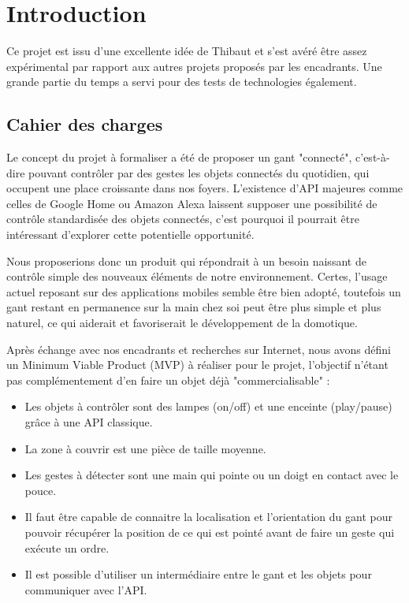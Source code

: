 \documentclass{article}
\begin{document}
    

    
    \tableofcontents

    \section{Introduction}

        Ce projet est issu d'une excellente idée de Thibaut et s'est avéré être assez expérimental par rapport aux autres projets proposés par les encadrants. Une grande partie du temps a servi pour des tests de technologies également.

        \subsection{Cahier des charges}

        Le concept du projet à formaliser a été de proposer un gant "connecté", 
            c'est-à-dire pouvant contrôler par des gestes les objets connectés du quotidien,
            qui occupent une place croissante dans nos foyers. L'existence d'API majeures comme celles
            de Google Home ou Amazon Alexa laissent supposer une possibilité de contrôle standardisée
            des objets connectés, c'est pourquoi il pourrait être intéressant d'explorer cette
            potentielle opportunité.

        Nous proposerions donc un produit qui répondrait à un besoin naissant de contrôle simple des nouveaux
            éléments de notre environnement. Certes, l'usage actuel reposant sur des applications mobiles
            semble être bien adopté, toutefois un gant restant en permanence sur la main chez soi peut être plus
            simple et plus naturel, ce qui aiderait et favoriserait le développement de la domotique.

        Après échange avec nos encadrants et recherches sur Internet, nous avons défini un Minimum Viable Product (MVP)
            à réaliser pour le projet, l'objectif n'étant pas complémentement d'en faire un objet déjà
            "commercialisable" :
            \begin{itemize}
                \item Les objets à contrôler sont des lampes (on/off) et une enceinte (play/pause) grâce à une API classique.
                \item La zone à couvrir est une pièce de taille moyenne.
                \item Les gestes à détecter sont une main qui pointe ou un doigt en contact avec le pouce.
                \item Il faut être capable de connaitre la localisation et l'orientation du gant pour pouvoir
                        récupérer la position de ce qui est pointé
                        avant de faire un geste qui exécute un ordre.
                \item Il est possible d'utiliser un intermédiaire entre le gant et les objets pour communiquer avec l'API.
            \end{itemize}
\end{document}
